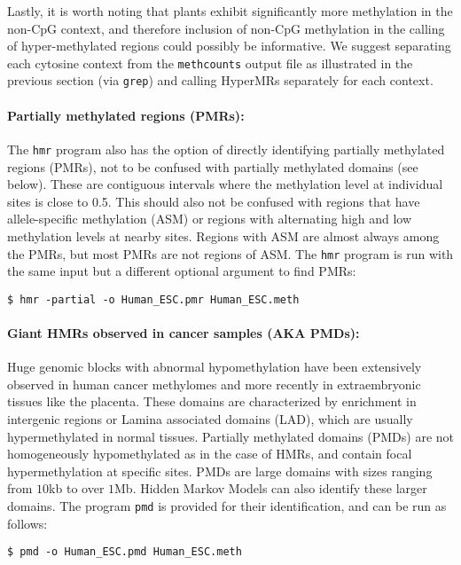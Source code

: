 \documentclass[10pt]{article}
\newcommand{\prog}[1]{\texttt{#1}}
\begin{document}
Lastly, it is worth noting that plants exhibit significantly more
methylation in the non-CpG context, and therefore inclusion of non-CpG
methylation in the calling of hyper-methylated regions could possibly
be informative. We suggest separating each cytosine context from the
\prog{methcounts} output file as illustrated in the previous section
(via \prog{grep}) and calling HyperMRs separately for each context.

\paragraph{Partially methylated regions (PMRs):}
The \prog{hmr} program also has the option of directly identifying
partially methylated regions (PMRs), not to be confused with partially
methylated domains (see below). These are contiguous intervals where
the methylation level at individual sites is close to 0.5. This should
also not be confused with regions that have allele-specific
methylation (ASM) or regions with alternating high and low methylation
levels at nearby sites. Regions with ASM are almost always among the
PMRs, but most PMRs are not regions of ASM. The \prog{hmr} program is
run with the same input but a different optional argument to find
PMRs:
\begin{verbatim}
$ hmr -partial -o Human_ESC.pmr Human_ESC.meth
\end{verbatim}

\paragraph{Giant HMRs observed in cancer samples (AKA PMDs):}

Huge genomic blocks with abnormal hypomethylation have been
extensively observed in human cancer methylomes and more recently in
extraembryonic tissues like the placenta. These domains are
characterized by enrichment in intergenic regions or Lamina associated
domains (LAD), which are usually hypermethylated in normal
tissues. Partially methylated domains (PMDs) are not homogeneously
hypomethylated as in the case of HMRs, and contain focal
hypermethylation at specific sites. PMDs are large domains with sizes
ranging from $10$kb to over $1$Mb.  Hidden Markov Models can also
identify these larger domains. The program \prog{pmd} is provided for
their identification, and can be run as follows:

\begin{verbatim}
$ pmd -o Human_ESC.pmd Human_ESC.meth
\end{verbatim}
\end{document}
